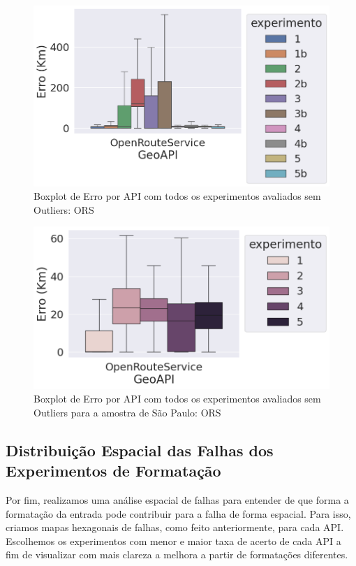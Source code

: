 \begin{figure}[h]
    \centering
    \includegraphics[width=\textwidth]{Figuras/boxplotApiOrsSemOut.png}
    \caption{Boxplot de Erro por API com todos os experimentos avaliados sem Outliers: ORS}
    \label{fig:boxplot-api-ors-semout-bh}
\end{figure}

\begin{figure}[h]
    \centering
    \includegraphics[width=\textwidth]{Figuras/boxplotApiOrsSemOutSP.png}
    \caption{Boxplot de Erro por API com todos os experimentos avaliados sem Outliers para a amostra de São Paulo: ORS}
    \label{fig:boxplot-api-ors-semout-sp}
\end{figure}

\subsection{Distribuição Espacial das Falhas dos Experimentos de Formatação}

Por fim, realizamos uma análise espacial de falhas para entender de que forma a formatação da entrada pode contribuir para a falha de forma espacial. 
Para isso, criamos mapas hexagonais de falhas, como feito anteriormente, para cada API. Escolhemos os experimentos com menor e maior taxa de acerto de cada API a fim de visualizar com mais clareza a melhora a partir de formatações diferentes. 

